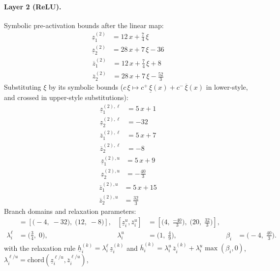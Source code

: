 \documentclass[11pt]{article}
\begin{document}
\paragraph{Layer 2 (ReLU).}
Symbolic pre-activation bounds after the linear map:
\begin{align*}
\underline{z}^{(2)}_{1} &= 12\,x + \frac{7}{4}\,\xi \\
\underline{z}^{(2)}_{2} &= 28\,x + 7\,\xi - 36
\end{align*}
\begin{align*}
\overline{z}^{(2)}_{1} &= 12\,x + \frac{7}{4}\,\xi + 8 \\
\overline{z}^{(2)}_{2} &= 28\,x + 7\,\xi - \frac{52}{3}
\end{align*}
Substituting $\xi$ by its symbolic bounds ($c\,\xi \mapsto c^{+}\,\underline{\xi}(x) + c^{-}\,\overline{\xi}(x)$ in lower-style, and crossed in upper-style substitutions):
\begin{align*}
\underline{z}^{(2),\ell}_{1} &= 5\,x + 1 \\
\underline{z}^{(2),\ell}_{2} &= -32
\end{align*}
\begin{align*}
\overline{z}^{(2),\ell}_{1} &= 5\,x + 7 \\
\overline{z}^{(2),\ell}_{2} &= -8
\end{align*}
\begin{align*}
\underline{z}^{(2),u}_{1} &= 5\,x + 9 \\
\underline{z}^{(2),u}_{2} &= -\frac{40}{3}
\end{align*}
\begin{align*}
\overline{z}^{(2),u}_{1} &= 5\,x + 15 \\
\overline{z}^{(2),u}_{2} &= \frac{32}{3}
\end{align*}
Branch domains and relaxation parameters:
\begin{align*}
[\underline{z}^{\ell}_i, \overline{z}^{\ell}_i] &= [\bigl(-4,\; -32\bigr),\; \bigl(12,\; -8\bigr)], & [\underline{z}^{u}_i, \overline{z}^{u}_i] &= [\bigl(4,\; \frac{-40}{3}\bigr),\; \bigl(20,\; \frac{32}{3}\bigr)], \\
\lambda^{\ell}_i &= \bigl(\frac{3}{4},\; 0\bigr), & \lambda^{u}_i &= \bigl(1,\; \frac{4}{9}\bigr), & \beta_i &= \bigl(-4,\; \frac{40}{3}\bigr).
\end{align*}
with the relaxation rule
$\underline{h}^{(k)}_i = \lambda^{\ell}_i\, \underline{z}^{(k)}_i$ and
$\overline{h}^{(k)}_i = \lambda^{u}_i\, \overline{z}^{(k)}_i + \lambda^{u}_i \max(\beta_i, 0)$,
$\lambda^{\ell/u}_i = \mathrm{chord}(\underline{z}_i^{\ell/u}, \overline{z}_i^{\ell/u})$,
\end{document}
